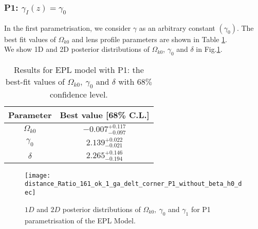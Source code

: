 \documentclass[12pt]{report}
\begin{document}
\subsubsection{P1: $\gamma_I(z)=\gamma_0$}
In the first parametrisation, we consider $\gamma$ as an arbitrary constant $(\gamma_0)$. The best fit values of $\Omega_{k0}$ and lens profile parameters are shown in Table \ref{tb:sl3}. \\
We show 1D and 2D posterior distributions of $\Omega_{k0}$, $\gamma_0$ and $\delta$ in Fig.\ref{fig:sl4}.
\begin{table}[H]
\centering
\begin{large}
    \begin{tabular}[b]{|c|c|}\hline
       Parameter & Best value [68\% C.L.] \\ \hline \hline 
    $\Omega_{k0}$ & $-0.007^{+0.117}_{-0.097}$ \\ \hline
   $\gamma_0$ & $2.139^{+0.022}_{-0.021}$ \\ \hline
   $\delta$ & $2.265^{+0.146}_{-0.194}$ \\ \hline
    \end{tabular}
\end{large}
\caption{Results for EPL model with P1: the best-fit values of $\Omega_{k0},~\gamma_0$ and $\delta$ with $68\%$ confidence level. }
\label{tb:sl3}
\end{table}
\begin{figure}[H]
    \centering
    \texttt{[image: distance\_Ratio\_161\_ok\_1\_ga\_delt\_corner\_P1\_without\_beta\_h0\_dec]}
    \caption{$1D$ and $2D$ posterior distributions of $\Omega_{k0},~ \gamma_0$ and $\gamma_1$ for P1 parametrisation of the EPL Model.}
    \label{fig:sl4}
\end{figure}
\end{document}
